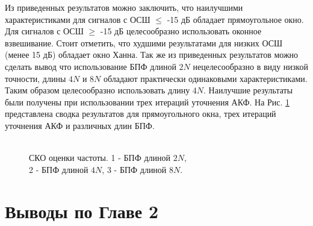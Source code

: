Из приведенных результатов можно заключить, что наилучшими характеристиками для сигналов с ОСШ ${\le}$ -15 дБ обладает прямоугольное окно. Для сигналов с ОСШ ${\ge}$ 
-15 дБ целесообразно использовать оконное взвешивание. Стоит отметить, что худшими результатами для низких ОСШ (менее 15 дБ) обладает окно Ханна.
Так же из приведенных результатов можно сделать вывод что использование БПФ длиной ${2N}$ нецелесообразно в виду низкой
точности, длины ${4N}$ и ${8N}$ обладают практически одинаковыми характеристиками. Таким образом целесообразно использовать длину ${4N}$. Наилучшие результаты были получены при
использовании трех итераций уточнения АКФ. На Рис. \ref{pic:2vs4vs8} представлена сводка результатов для прямоугольного окна, трех итераций уточнения АКФ и различных длин БПФ.

\begin{figure}[h]
	\center{}
	\caption{\\СКО оценки частоты. 1 - БПФ длиной ${2N}$,\\2 - БПФ длиной ${4N}$, 3 - БПФ длиной ${8N}$.}
	\label{pic:2vs4vs8}
\end{figure}


\section{Выводы по Главе 2}

